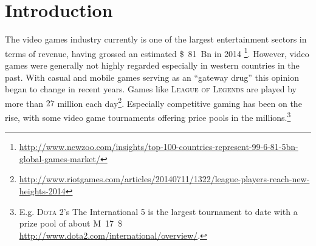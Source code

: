\section{Introduction}
\label{sec:introduction}

The video games industry currently is one of the largest entertainment 
sectors in terms of revenue, having grossed an estimated 
\SI{81}[\$]{Bn} in 2014 
\footnote{\url{http://www.newzoo.com/insights/top-100-countries-represent-99-6-81-5bn-global-games-market/}}. 
However, video games were generally not highly regarded especially in 
western countries in the past. With casual and mobile games serving as 
an ``gateway drug'' this opinion began to change in recent years. Games 
like \textsc{League of Legends} are played by more than $27$ million 
each 
day\footnote{\url{http://www.riotgames.com/articles/20140711/1322/league-players-reach-new-heights-2014}}. 
Especially competitive gaming has been on the rise, with some video 
game tournaments offering price pools in the millions.\footnote{E.g. 
\textsc{Dota 2}'s The International 5  is the largest tournament to 
date with a prize pool of about \SI{17}[M]{\$} 
\url{http://www.dota2.com/international/overview/}.} 




